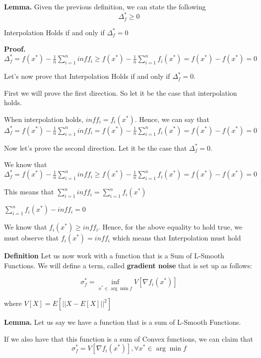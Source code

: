 \noindent \textbf{Lemma.} Given the previous definition, we can state the following 
\begin{equation}
    \Delta^*_f \geq 0
\end{equation}

Interpolation Holds if and only if $\Delta^*_f = 0$ 

\noindent \textbf{Proof.} $\Delta^*_f = f(x^*) - \frac{1}{n} \sum_{i=1}^{n} inf f_i \geq f(x^*) - \frac{1}{n} \sum_{i=1}^{n} f_i(x^*) = f(x^*) - f(x^*) = 0$

Let's now prove that Interpolation Holds if and only if $\Delta^*_f = 0$. 

First we will prove the first direction. So let it be the case that interpolation holds. 

When interpolation holds, $inf f_i = f_i(x^*)$. Hence, we can say that $\Delta^*_f = f(x^*) - \frac{1}{n} \sum_{i=1}^{n} inf f_i = f(x^*) - \frac{1}{n} \sum_{i=1}^{n} f_i(x^*) = f(x^*) - f(x^*) = 0$

Now let's prove the second direction. Let it be the case that $\Delta^*_f = 0$. 

We know that $\Delta^*_f = f(x^*) - \frac{1}{n} \sum_{i=1}^{n} inf f_i \geq f(x^*) - \frac{1}{n} \sum_{i=1}^{n} f_i(x^*) = f(x^*) - f(x^*) = 0$ \newline 

This means that $\sum_{i=1}^{n} inf f_i = \sum_{i=1}^{n} f_i(x^*)$ \newline 

$\sum_{i=1}^{n} f_i(x^*) - inf f_i = 0$ \newline 

We know that $f_i(x^*) \geq inf f_i$. Hence, for the above equality to hold true, we must observe that $f_i(x^*) = inf f_i$ which means that Interpolation must hold

\noindent \textbf{Definition} Let us now work with a function that is a Sum of L-Smooth Functions. We will define a term, called \textbf{gradient noise} that is set up as follows: 

\begin{equation}
    \sigma_f^* = \inf_{x^* \in \arg \min f} V[\nabla f_i(x^*)]
\end{equation}

where $V[X] = E[|| X - E[X] ||^2]$ \newline 

\noindent \textbf{Lemma.} Let us say we have a function that is a sum of L-Smooth Functions. 

If we also have that this function is a sum of Convex functions, we can claim that 
\begin{equation}
    \sigma_f^* = V[\nabla f_i(x^*)], \forall x^* \in \arg \min f
\end{equation}

